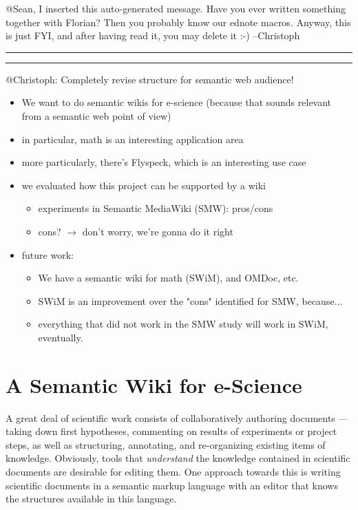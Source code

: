\documentclass{llncs}
\begin{document}
@Sean, I inserted this auto-generated message. Have you ever written something together
with Florian? Then you probably know our ednote macros. Anyway, this is just FYI, and
after having read it, you may delete it :-) --Christoph
\hrule
\edexplanation
\hrule
  \begin{todo}{@Christoph: Completely revise structure for semantic web audience!}
    \begin{itemize}
    \item We want to do semantic wikis for e-science (because that sounds relevant from a
      semantic web point of view)
    \item in particular, math is an interesting application area
    \item more particularly, there's Flyspeck, which is an interesting use case
    \item we evaluated how this project can be supported by a wiki
      \begin{itemize}
      \item experiments in Semantic
        MediaWiki (SMW): pros/cons
      \item cons? $\to$ don't worry, we're gonna do it right
      \end{itemize}
    \item future work:
      \begin{itemize}
      \item We have a semantic wiki for math (SWiM), and OMDoc, etc.
      \item SWiM is an improvement over the "cons" identified for SMW, because...
      \item everything that
        did not work in the SMW study will work in SWiM, eventually.
      \end{itemize}
    \end{itemize}
  \end{todo}

\section{A Semantic Wiki for e-Science}

A great deal of scientific work consists of collaboratively authoring documents ---
taking down first hypotheses, commenting on results of experiments or project steps, as
well as structuring, annotating, and re-organizing existing items of knowledge.
Obviously, tools that \emph{understand} the knowledge contained in scientific documents are
desirable for editing them.  One approach towards this is writing scientific documents in
a semantic markup language with an editor that knows the structures available in this
language.
\end{document}

